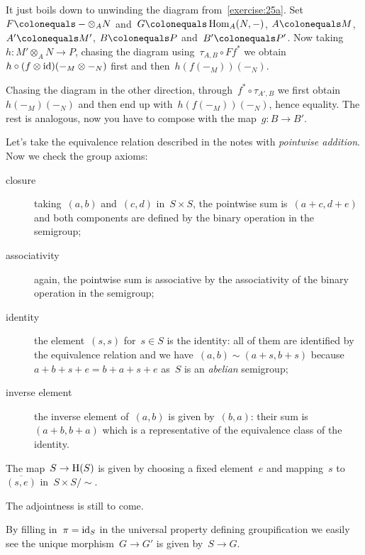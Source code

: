 \begin{exercise}
  It just boils down to unwinding the diagram from~\autoref{exercise:25a}. Set~$F\colonequals-\otimes_A N$ and~$G\colonequals\Hom_A(N,-)$, $A\colonequals M$, $A'\colonequals M'$, $B\colonequals P$ and~$B'\colonequals P'$. Now taking~$h\colon M'\otimes_A N\to P$, chasing the diagram using~$\tau_{A,B}\circ Ff^*$ we obtain~$h\circ (f\otimes\mathrm{id})(-_M\otimes-_N)$ first and then~$h(f(-_M))(-_N)$.

  Chasing the diagram in the other direction, through~$f^*\circ\tau_{A',B}$ we first obtain~$h(-_M)(-_N)$ and then end up with~$h(f(-_M))(-_N)$, hence equality. The rest is analogous, now you have to compose with the map~$g\colon B\to B'$.
\end{exercise}

\begin{exercise} %
  Let's take the equivalence relation described in the notes with \emph{pointwise addition}. Now we check the group axioms:
  \begin{description}
    \item[closure] taking~$(a,b)$ and~$(c,d)$ in~$S\times S$, the pointwise sum is~$(a+c,d+e)$ and both components are defined by the binary operation in the semigroup;
    \item[associativity] again, the pointwise sum is associative by the associativity of the binary operation in the semigroup;
    \item[identity] the element~$(s,s)$ for~$s\in S$ is the identity: all of them are identified by the equivalence relation and we have~$(a,b)\sim(a+s,b+s)$ because~$a+b+s+e=b+a+s+e$ as~$S$ is an \emph{abelian} semigroup;
    \item[inverse element] the inverse element of~$(a,b)$ is given by~$(b,a)$: their sum is~$(a+b,b+a)$ which is a representative of the equivalence class of the identity.
  \end{description}

  The map~$S\to\mathrm{H}(S)$ is given by choosing a fixed element~$e$ and mapping~$s$ to~$\overline{(s,e)}$ in~$S\times S/{\sim}$.

  The adjointness is still to come.
\end{exercise}

\begin{exercise}
  By filling in~$\pi=\mathrm{id}_S$ in the universal property defining groupification we easily see the unique morphism~$G\to G'$ is given by~$S\to G$.
\end{exercise}

